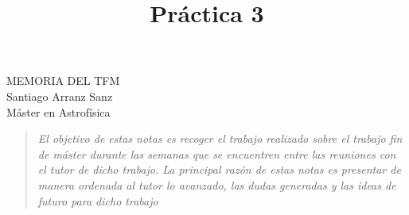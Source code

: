 \documentclass{article}
\title{Pr\'actica 3}
\begin{document}
\vspace*{2 cm}
\begin{center}
{\LARGE MEMORIA DEL TFM}\\[0.5cm]
{\large Santiago Arranz Sanz}\\[0.2cm]
{\large Máster en Astrofísica}\\[0.2cm]


\vspace*{0.1cm}
\end{center}


\hrulefill
\begin{quote}
\textit{El objetivo de estas notas es recoger el trabajo realizado sobre el trabajo fin de máster durante las semanas que se encuentren entre las reuniones con el tutor de dicho trabajo. La principal razón de estas notas es presentar de manera ordenada al tutor lo avanzado, las dudas generadas y las ideas de futuro para dicho trabajo}
\end{quote}
\hrulefill






 
 
\end{document}
